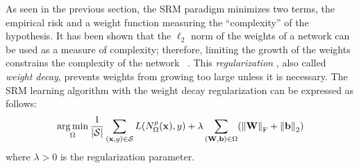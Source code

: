 As seen in the previous section, the SRM paradigm minimizes two terms, the empirical risk and a weight function measuring the ``complexity'' of the hypothesis.
It has been shown that the $\ell_2$ norm of the weights of a network can be used as a measure of complexity; therefore, limiting the growth of the weights constrains the complexity of the network ~\cite{hinton1987learning}.
This \emph{regularization} \cite{tikhonov1977solutions,krogh1992simple}, also called \emph{weight decay}, prevents weights from growing too large unless it is necessary.
The SRM learning algorithm with the weight decay regularization can be expressed as follows:
\begin{equation}
  \argmin_{\weights} \frac{1}{|\mathcal{S}|} \sum_{(\xvec, y) \in \mathcal{S}} L(N^\act_\weights(\xvec), y) + \lambda \sum_{(\Wmat, \bvec) \in \weights} \left( \norm{\Wmat}_\mathrm{F} + \norm{\bvec}_\mathrm{2} \right)
\end{equation}
where $\lambda > 0$ is the regularization parameter.


